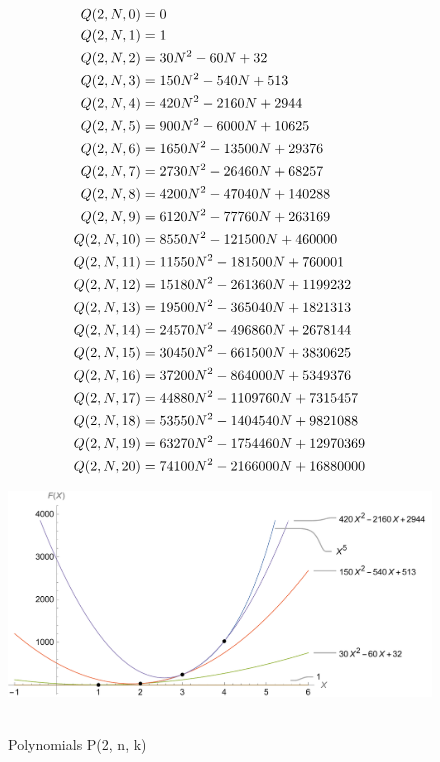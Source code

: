 ﻿\begin{align*}
    {Q}(2,N,0) &= 0 \\
    {Q}(2,N,1) &= 1 \\
    {Q}(2,N,2) &= 30N^2 - 60N + 32 \\
    {Q}(2,N,3) &= 150N^2 - 540N + 513 \\
    {Q}(2,N,4) &= 420N^2 - 2160N + 2944 \\
    {Q}(2,N,5) &= 900N^2 - 6000N + 10625 \\
    {Q}(2,N,6) &= 1650N^2 - 13500N + 29376 \\
    {Q}(2,N,7) &= 2730N^2 - 26460N + 68257 \\
    {Q}(2,N,8) &= 4200N^2 - 47040N + 140288 \\
    {Q}(2,N,9) &= 6120N^2 - 77760N + 263169 \\
    {Q}(2,N,10) &= 8550N^2 - 121500N + 460000 \\
    {Q}(2,N,11) &= 11550N^2 - 181500N + 760001 \\
    {Q}(2,N,12) &= 15180N^2 - 261360N + 1199232 \\
    {Q}(2,N,13) &= 19500N^2 - 365040N + 1821313 \\
    {Q}(2,N,14) &= 24570N^2 - 496860N + 2678144 \\
    {Q}(2,N,15) &= 30450N^2 - 661500N + 3830625 \\
    {Q}(2,N,16) &= 37200N^2 - 864000N + 5349376 \\
    {Q}(2,N,17) &= 44880N^2 - 1109760N + 7315457 \\
    {Q}(2,N,18) &= 53550N^2 - 1404540N + 9821088 \\
    {Q}(2,N,19) &= 63270N^2 - 1754460N + 12970369 \\
    {Q}(2,N,20) &= 74100N^2 - 2166000N + 16880000
\end{align*}
\begin{figure}[H]
    \centering
    \includegraphics[width=1\textwidth]{sections/images/04_fifth_power_with_q_1_n_k}
    ~\caption{Polynomials P(2, n, k)}\label{fig:figure4}
\end{figure}

